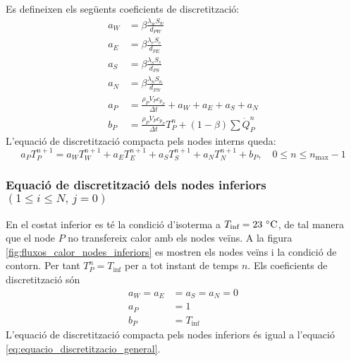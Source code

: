 Es defineixen els següents coeficients de discretització:
\begin{align}
	a_W &= \beta \frac{\lambda_w S_w}{d_{PW}} \\
	a_E &= \beta \frac{\lambda_e S_e}{d_{PE}} \\
	a_S &= \beta \frac{\lambda_s S_s}{d_{PS}} \\
	a_N &= \beta \frac{\lambda_n S_n}{d_{PN}} \\
	a_P &= \frac{\rho_P V_P c_{p_P}}{\Delta t} + a_W + a_E + a_S + a_N \\
	b_P &= \frac{\rho_P V_P c_{p_P}}{\Delta t} T_P^n + (1 - \beta) \sum \dot{Q}_P^n	
\end{align}
L'equació de discretització compacta pels nodes interns queda:
\begin{equation} \label{eq:equacio_discretitzacio_general}
	a_P T_P^{n+1} = 
	a_W T_W^{n+1} + 
	a_E T_E^{n+1} + 
	a_S T_S^{n+1} + 
	a_N T_N^{n+1} + 
	b_P, 
	\quad
	0 \leq n \leq n_\text{max}-1
\end{equation}

\subsubsection{Equació de discretització dels nodes inferiors \texorpdfstring{$\left( 1 \leq i \leq N, \, j = 0 \right)$}{}}

En el costat inferior es té la condició d'isoterma a $T_\text{inf} = 23 \ \celsius$, de tal manera que el node $P$ no transfereix calor amb els nodes veïns. A la figura \ref{fig:fluxos_calor_nodes_inferiors} es mostren els nodes veïns i la condició de contorn. Per tant $T_P^n = T_\text{inf}$ per a tot instant de temps $n$. Els coeficients de discretització són
\begin{align}
	a_W = a_E &= a_S = a_N = 0 \\
	a_P &= 1 \\
	b_P &= T_\text{inf}
\end{align}
L'equació de discretització compacta pels nodes inferiors és igual a l'equació \eqref{eq:equacio_discretitzacio_general}.

